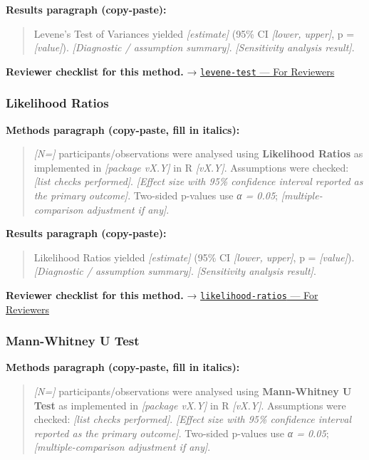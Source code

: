 \documentclass[
]{article}
\begin{document}
\textbf{Results paragraph (copy-paste):}

\begin{quote}
Levene's Test of Variances yielded \emph{{[}estimate{]}} (95\% CI
\emph{{[}lower, upper{]}}, p = \emph{{[}value{]}}). \emph{{[}Diagnostic
/ assumption summary{]}}. \emph{{[}Sensitivity analysis result{]}}.
\end{quote}

\textbf{Reviewer checklist for this method.} →
\href{../chapters/04-inferential/levene-test.Rmd\#for-reviewers}{\texttt{levene-test}
--- For Reviewers}

\subsubsection{Likelihood Ratios}\label{likelihood-ratios}

\textbf{Methods paragraph (copy-paste, fill in italics):}

\begin{quote}
\emph{{[}N={]}} participants/observations were analysed using
\textbf{Likelihood Ratios} as implemented in \emph{{[}package vX.Y{]}}
in R \emph{{[}vX.Y{]}}. Assumptions were checked: \emph{{[}list checks
performed{]}}. \emph{{[}Effect size with 95\% confidence interval
reported as the primary outcome{]}}. Two-sided p-values use \emph{α =
0.05}; \emph{{[}multiple-comparison adjustment if any{]}}.
\end{quote}

\textbf{Results paragraph (copy-paste):}

\begin{quote}
Likelihood Ratios yielded \emph{{[}estimate{]}} (95\% CI \emph{{[}lower,
upper{]}}, p = \emph{{[}value{]}}). \emph{{[}Diagnostic / assumption
summary{]}}. \emph{{[}Sensitivity analysis result{]}}.
\end{quote}

\textbf{Reviewer checklist for this method.} →
\href{../chapters/14-clinical/likelihood-ratios.Rmd\#for-reviewers}{\texttt{likelihood-ratios}
--- For Reviewers}

\subsubsection{Mann-Whitney U Test}\label{mann-whitney-u-test}

\textbf{Methods paragraph (copy-paste, fill in italics):}

\begin{quote}
\emph{{[}N={]}} participants/observations were analysed using
\textbf{Mann-Whitney U Test} as implemented in \emph{{[}package vX.Y{]}}
in R \emph{{[}vX.Y{]}}. Assumptions were checked: \emph{{[}list checks
performed{]}}. \emph{{[}Effect size with 95\% confidence interval
reported as the primary outcome{]}}. Two-sided p-values use \emph{α =
0.05}; \emph{{[}multiple-comparison adjustment if any{]}}.
\end{quote}
\end{document}
